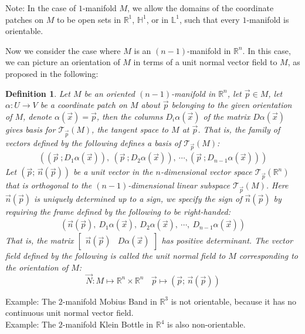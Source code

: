 \documentclass[11pt,oneside]{book}
\theoremstyle{break}
\theoremstyle{break}
\newtheorem{defn}{Definition}[corL]
\newcommand{\R}{\mathbb{R}}
\newcommand{\T}{\mathcal{T}}
\newcommand{\bmat}[1]{\begin{bmatrix} #1 \end{bmatrix}}
\newcommand{\note}{\color{red}Note: \color{black}}
\newcommand{\example}{\color{green}Example: \color{black}}
\begin{document}
\note In the case of $1$-manifold $M$, we allow the domains of the coordinate patches on $M$ to be open sets in $\R^1$, $\mathbb{H}^1$, or in $\mathbb{L}^1$, such that every $1$-manifold is orientable.\\
\newpage

Now we consider the case where $M$ is an $(n-1)$-manifold in $\R^n$. In this case, we can picture an orientation of $M$ in terms of a unit normal vector field to $M$, as proposed in the following:
\begin{defn}
Let $M$ be an oriented $(n-1)$-manifold in $\R^n$, let $\vec{p} \in M$, let $\alpha:U \to V$ be a coordinate patch on $M$ about $\vec{p}$ belonging to the given orientation of $M$, denote $\alpha(\vec{x}) = \vec{p}$, then the columns $D_i\alpha(\vec{x})$ of the matrix $D\alpha(\vec{x})$ gives basis for $\T_{\vec{p}}(M)$, the tangent space to $M$ at $\vec{p}$. That is, the family of vectors defined by the following defines a basis of $\T_{\vec{p}}(M)$:
\begin{align*}
\left(\left(\vec{p}\ ; D_1\alpha(\vec{x})\right),\ \left(\vec{p}\ ; D_2\alpha(\vec{x})\right),\ \cdots, \left(\vec{p}\ ; D_{n-1}\alpha(\vec{x})\right)\right)
\end{align*}
Let $(\vec{p};\, \vec{n}(\vec{p}))$ be a unit vector in the $n$-dimensional vector space $\T_{\vec{p}}(\R^n)$ that is orthogonal to the $(n-1)$-dimensional linear subspace $\T_{\vec{p}}(M)$. Here $\vec{n}(\vec{p})$ is uniquely determined up to a sign, we specify the sign of $\vec{n}(\vec{p})$ by requiring the frame defined by the following to be right-handed:
\begin{align*}
\left(\vec{n}(\vec{p}),\ D_1\alpha(\vec{x}),\ D_2\alpha(\vec{x}),\ \cdots,\ D_{n-1}\alpha(\vec{x})\right)
\end{align*}
That is, the matrix $\bmat{\vec{n}(\vec{p})& D\alpha(\vec{x})}$ has positive determinant.  The vector field defined by the following is called the unit normal field to $M$ corresponding to the orientation of $M$:
$$\vec{N}:M \mapsto \R^n\times \R^n \ \ \ \ \vec{p}\mapsto (\vec{p};\, \vec{n}(\vec{p}))$$
\end{defn}
 
\example The $2$-manifold Mobius Band in $\R^3$ is not orientable, because it has no continuous unit normal vector field. \\

\example The $2$-manifold Klein Bottle in $\R^4$ is also non-orientable. \\
\end{document}
